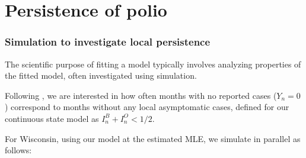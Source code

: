 \section{Persistence of polio}

\begin{frame}[fragile]

\frametitle{Simulation to investigate local persistence}

\bi
\item 
The scientific purpose of fitting a model typically involves analyzing properties of the fitted model, often investigated using simulation.
\item Following \citet{Martinez-Bakker2015}, we are interested in how often months with no reported cases ($Y_n=0$) correspond to months without any local asymptomatic cases, defined for our continuous state model as $I^B_n+I^O_n<1/2$.
\item For Wisconsin, using our model at the estimated MLE, we simulate in parallel as follows:
\ei
\begin{knitrout}\small
{}\color{fgcolor}
\end{knitrout}

\end{frame}
